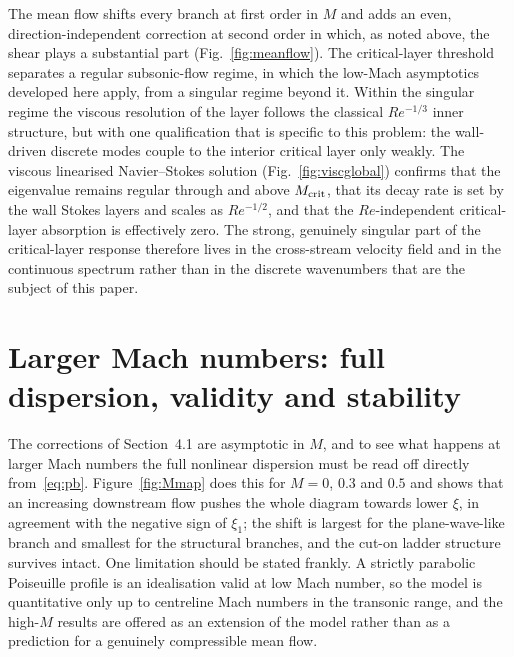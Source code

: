 \documentclass[11pt]{article}
\begin{document}
The mean flow shifts every branch at first order in $M$ and adds an even, direction-independent
correction at second order in which, as noted above, the shear plays a substantial part
(Fig.~\ref{fig:meanflow}). The critical-layer threshold separates a regular subsonic-flow regime, in
which the low-Mach asymptotics developed here apply, from a singular regime beyond it. Within the
singular regime the viscous resolution of the layer follows the classical $Re^{-1/3}$ inner structure,
but with one qualification that is specific to this problem: the wall-driven discrete modes couple to
the interior critical layer only weakly. The viscous linearised Navier--Stokes solution
(Fig.~\ref{fig:viscglobal}) confirms that the eigenvalue remains regular through and above
$M_{\rm crit}$, that its decay rate is set by the wall Stokes layers and scales as $Re^{-1/2}$, and that
the $Re$-independent critical-layer absorption is effectively zero. The strong, genuinely singular part
of the critical-layer response therefore lives in the cross-stream velocity field and in the continuous
spectrum rather than in the discrete wavenumbers that are the subject of this paper.

\section{Larger Mach numbers: full dispersion, validity and stability}
The corrections of Section~4.1 are asymptotic in $M$, and to see what happens at larger Mach numbers the
full nonlinear dispersion must be read off directly from~\eqref{eq:pb}. Figure~\ref{fig:Mmap} does this
for $M=0$, $0.3$ and $0.5$ and shows that an increasing downstream flow pushes the whole diagram towards
lower $\xi$, in agreement with the negative sign of $\xi_1$; the shift is largest for the plane-wave-like
branch and smallest for the structural branches, and the cut-on ladder structure survives intact. One
limitation should be stated frankly. A strictly parabolic Poiseuille profile is an idealisation valid at
low Mach number, so the model is quantitative only up to centreline Mach numbers in the transonic range,
and the high-$M$ results are offered as an extension of the model rather than as a prediction for a genuinely
compressible mean flow.
\end{document}
